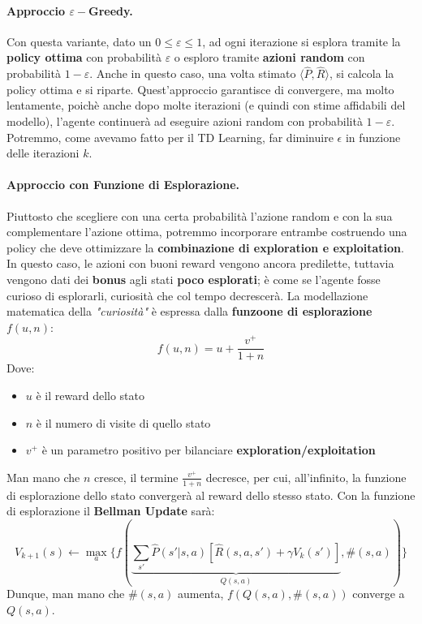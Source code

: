 \paragraph{Approccio $\varepsilon-$Greedy.}
Con questa variante, dato un $0 \leq \varepsilon \leq 1$, ad ogni iterazione si esplora tramite la \textbf{policy ottima} con probabilità $\varepsilon$ o 
esploro tramite \textbf{azioni random} con probabilità $1 - \varepsilon$. Anche in questo caso, una volta stimato $\langle \widehat{P},\widehat{R} \rangle$,
si calcola la policy ottima e si riparte. Quest'approccio garantisce di convergere, ma molto lentamente, poichè anche dopo molte
iterazioni (e quindi con stime affidabili del modello), l'agente continuerà ad eseguire azioni random con probabilità $1 -\varepsilon$.
Potremmo, come avevamo fatto per il TD Learning, far diminuire $\epsilon$ in funzione delle iterazioni $k$.

\paragraph{Approccio con Funzione di Esplorazione.}
Piuttosto che scegliere con una certa probabilità l'azione random e con la sua complementare l'azione ottima, potremmo incorporare entrambe
costruendo una policy che deve ottimizzare la \textbf{combinazione di exploration e exploitation}. In questo caso, le azioni
con buoni reward vengono ancora predilette, tuttavia vengono dati dei \textbf{bonus} agli stati \textbf{poco esplorati}; è come se l'agente
fosse curioso di esplorarli, curiosità che col tempo decrescerà. La modellazione matematica della \textit{"curiosità"} è espressa
dalla \textbf{funzoone di esplorazione} $f(u,n)$:
\begin{equation}
    f(u,n) = u + \frac{v^+}{1 + n}
\end{equation}
Dove:
\begin{itemize}
    \item $u$ è il reward dello stato
    \item $n$ è il numero di visite di quello stato
    \item $v^+$ è un parametro positivo per bilanciare \textbf{exploration/exploitation}
\end{itemize}
Man mano che $n$ cresce, il termine $\frac{v^+}{1 + n}$ decresce, per cui, all'infinito, la funzione di esplorazione dello stato convergerà al reward dello stesso stato.
Con la funzione di esplorazione il \textbf{Bellman Update} sarà:
\begin{equation}
    V_{k + 1}(s) \leftarrow \max_a \{f(\underbrace{\sum_{s'} \widehat{P}(s' | s,a)\left[\widehat{R}(s,a,s') + \gamma V_k(s')\right]}_{Q(s,a)},  \#(s,a))\}
\end{equation}
Dunque, man mano che $\#(s,a)$ aumenta, $f(Q(s,a),\#(s,a))$ converge a $Q(s,a)$.

